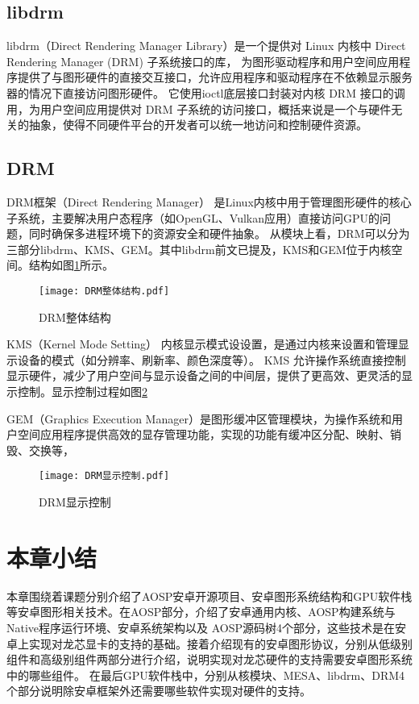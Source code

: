 \subsection{libdrm}
libdrm（Direct Rendering Manager Library）是一个提供对 Linux 内核中 Direct Rendering Manager (DRM) 子系统接口的库，
为图形驱动程序和用户空间应用程序提供了与图形硬件的直接交互接口，允许应用程序和驱动程序在不依赖显示服务器的情况下直接访问图形硬件。
它使用ioctl底层接口封装对内核 DRM 接口的调用，为用户空间应用提供对 DRM 子系统的访问接口，概括来说是一个与硬件无关的抽象，使得不同硬件平台的开发者可以统一地访问和控制硬件资源。

\subsection{DRM} 
DRM框架（Direct Rendering Manager） 是Linux内核中用于管理图形硬件的核心子系统，主要解决用户态程序（如OpenGL、Vulkan应用）直接访问GPU的问题，同时确保多进程环境下的资源安全和硬件抽象。
从模块上看，DRM可以分为三部分libdrm、KMS、GEM。其中libdrm前文已提及，KMS和GEM位于内核空间。结构如图\ref{fig:DRM整体结构}所示。

\begin{figure}[H]
  \centering
  \texttt{[image: DRM整体结构.pdf]}
  \caption{DRM整体结构}\label{fig:DRM整体结构}
\end{figure}

KMS（Kernel Mode Setting） 内核显示模式设设置，是通过内核来设置和管理显示设备的模式（如分辨率、刷新率、颜色深度等）。
KMS 允许操作系统直接控制显示硬件，减少了用户空间与显示设备之间的中间层，提供了更高效、更灵活的显示控制。显示控制过程如图\ref{fig:DRM显示控制}

GEM（Graphics Execution Manager）是图形缓冲区管理模块，为操作系统和用户空间应用程序提供高效的显存管理功能，实现的功能有缓冲区分配、映射、销毁、交换等，

\begin{figure}[H]
  \centering
  \texttt{[image: DRM显示控制.pdf]}
  \caption{DRM显示控制}\label{fig:DRM显示控制}
\end{figure}

\section{本章小结}
本章围绕着课题分别介绍了AOSP安卓开源项目、安卓图形系统结构和GPU软件栈等安卓图形相关技术。在AOSP部分，介绍了安卓通用内核、AOSP构建系统与Native程序运行环境、安卓系统架构以及
AOSP源码树4个部分，这些技术是在安卓上实现对龙芯显卡的支持的基础。接着介绍现有的安卓图形协议，分别从低级别组件和高级别组件两部分进行介绍，说明实现对龙芯硬件的支持需要安卓图形系统中的哪些组件。
在最后GPU软件栈中，分别从核模块、MESA、libdrm、DRM4个部分说明除安卓框架外还需要哪些软件实现对硬件的支持。

